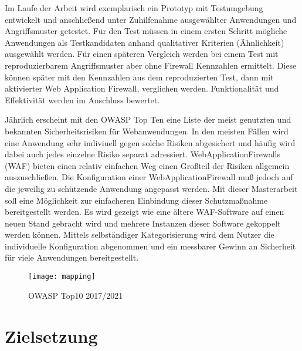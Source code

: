 Im Laufe der Arbeit wird exemplarisch ein Prototyp mit Testumgebung entwickelt  und anschließend unter Zuhilfenahme ausgewählter  Anwendungen und Angriffsmuster getestet. Für den Test müssen in einem ersten Schritt mögliche Anwendungen als Testkandidaten anhand qualitativer Kriterien (Ähnlichkeit) ausgewählt werden. Für einen späteren Vergleich werden bei  einem Test mit reproduzierbarem Angriffsmuster aber ohne Firewall Kennzahlen ermittelt. Diese können später mit den Kennzahlen aus dem reproduzierten Test, dann mit aktivierter Web Application Firewall, verglichen werden. Funktionalität und Effektivität werden im Anschluss bewertet. 

Jährlich erscheint mit den OWASP Top Ten \cite{owasp10}  eine Liste der meist genutzten und bekannten Sicherheitsrisiken für Webanwendungen. In den meisten Fällen wird eine Anwendung sehr indiviuell gegen solche Risiken abgesichert und häufig wird dabei auch jedes einzelne Risiko separat adressiert. WebApplicationFirewalls (WAF) bieten einen relativ einfachen Weg einen Großteil der Risiken allgemein auszuschließen. Die Konfiguration einer WebApplicationFirewall muß jedoch auf die jeweilig zu schützende Anwendung angepasst werden. Mit dieser Masterarbeit soll eine Möglichkeit zur einfacheren Einbindung dieser Schutzmaßnahme bereitgestellt werden. Es wird gezeigt wie eine ältere WAF-Software auf einen neuen Stand gebracht wird und mehrere Instanzen dieser Software gekoppelt werden können. Mittels selbständiger Kategorisierung wird dem Nutzer die individuelle Konfiguration abgenommen und ein messbarer Gewinn an Sicherheit für viele Anwendungen bereitgestellt. 


\begin{figure}[bht]
  \begin{center}
    \texttt{[image: mapping]}
    \caption{OWASP Top10 2017/2021 \cite{owasp10}}
    \label{fig.topten}
  \end{center}
\end{figure}


\section{Zielsetzung}



